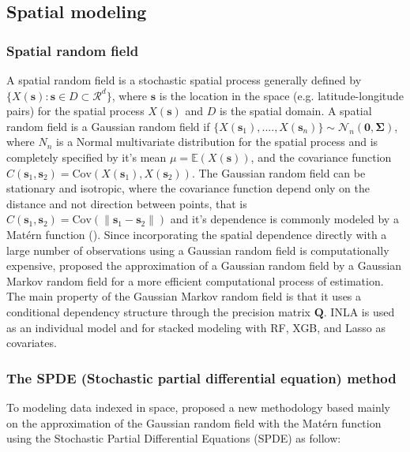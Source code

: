 \documentclass{article}
\begin{document}
\subsection{Spatial modeling}

\subsubsection{Spatial random field}
A spatial random field is a stochastic spatial process generally defined by $\{X(\boldsymbol{s}): \boldsymbol{s} \in D \subset \mathcal{R}^{d}\}$, where $\boldsymbol{s}$ is the location in the space (e.g. latitude-longitude pairs) for the spatial process $X(\boldsymbol{s})$ and $D$ is the spatial domain. A spatial random field is a Gaussian random field if $\{X(\boldsymbol{s}_{1}),...., X(\boldsymbol{s}_{n})\} \sim \mathcal{N}_{n}(\boldsymbol{0}, \boldsymbol{\Sigma})$, where $N_{n}$ is a Normal multivariate distribution for the spatial process and is completely specified by it's mean $\mu = \mathbb{E}(X(\boldsymbol{s}))$, and the covariance function $C(\boldsymbol{s}_{1}, \boldsymbol{s}_{2}) = \text{Cov}(X(\boldsymbol{s}_{1}), X(\boldsymbol{s}_{2}))$. The Gaussian random field can be stationary and isotropic, where the covariance function depend only on the distance and not direction between points, that is $C(\boldsymbol{s}_{1}, \boldsymbol{s}_{2}) = \text{Cov}(\|\boldsymbol{s}_{1} - \boldsymbol{s}_{2}\|)$ and it's dependence is commonly modeled by a Matérn function (\cite{stein2012interpolation}\cite{yuan2011models}). Since incorporating the spatial dependence directly with a large number of observations using a Gaussian random field is computationally expensive, \cite{rue2005gaussian} proposed the approximation of a Gaussian random field by a Gaussian Markov random field for a more efficient computational process of estimation. The main property of the Gaussian Markov random field is that it uses a conditional dependency structure through the precision matrix $\boldsymbol{Q}$. INLA is used as an individual model and for stacked modeling with RF, XGB, and Lasso as covariates. 


\subsubsection{The SPDE (Stochastic partial differential equation) method}

To modeling data indexed in space, \cite{lindgren2011explicit} proposed a new methodology based mainly on the approximation of the Gaussian random field with the Matérn function using the Stochastic Partial Differential Equations (SPDE) as follow:
\end{document}
